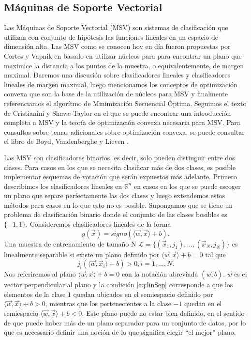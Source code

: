 \documentclass[letterpaper,12pt]{book}
\begin{document}
\subsection{Máquinas de Soporte Vectorial}

Las Máquinas de Soporte Vectorial (MSV) son sistemas de clasificación que utilizan con conjunto de hipótesis las funciones lineales en un espacio de dimensión alta. Las MSV como se conocen hoy en día fueron propuestas por Cortes y Vapnik en \cite{cortes_support-vector_1995} basado en utilizar núcleos para para encontrar un plano que maximice la distancia a los puntos de la muestra, o equivalentemente, de margen maximal. Daremos una discusión sobre clasificadores lineales y clasificadores lineales de margen maximal, luego mencionamos los conceptos de optimización convexa que son la base de la utilización de núcleos para MSV y finalmente referenciamos el algorítmo de Minimización Secuencial Óptima. Seguimos el texto de Cristianini y Shawe-Taylor \cite{cristianini_introduction_2000} en el que se puede encontrar una introducción completa a MSV y la teoría de optimización convexa necesaria para MSV. Para consultas sobre temas adicionales sobre optimización convexa, se puede consultar el libro de Boyd, Vandenberghe y Lieven \cite{boyd_convex_2004}.

Las MSV son clasificadores binarios, es decir, solo pueden distinguir entre dos clases. Para casos en los que se necesita clasificar más de dos clases, es posible implementar esquemas de votación que serán expuestos más adelante. Primero describimos los clasificadores lineales en $\mathbb{R}^n$ en casos en los que se puede escoger un plano que separe perfectamente las dos clases y luego extendemos estos métodos para casos en lo que esto no es posible. Supongamos que se tiene un problema de clasificación binario donde el conjunto de las clases bosibles es $\{-1,1\}$. Consideremos clasificadores lineales de la forma
\begin{equation}\label{eq:clasificadorLineal}
g(\vec{x}) = signo( \langle \vec{w}, \vec{x} \rangle + b).
\end{equation}
 Una muestra de entrenamiento de tamaño N  $\mathcal{L} = \{(\vec{x}_1, j_1), \dots, (\vec{x}_N, j_N)\}$ es linealmente separable si existe un plano definido por $\langle \vec{w}, \vec{x} \rangle +b =0$ tal que
\begin{equation}\label{eq:linSep}
j_{i}\left(\langle \vec{w}, \vec{x}_i \rangle +b\right)> 0, i = 1,\dots, N.
\end{equation}
Nos referiremos al plano $\langle \vec{w}, \vec{x} \rangle +b = 0$ con la notación abreviada $(\vec{w},b)$. $\vec{w}$ es el vector perpendicular al plano y la condición \ref{eq:linSep} corresponde a que los elementos de la clase $1$ quedan ubicados en el semiespacio definido por $\langle \vec{w}, \vec{x} \rangle +b > 0$, mientras que los pertenecientes a la clase $-1$ quedan en el semiespacio $\langle \vec{w}, \vec{x} \rangle + b< 0$. Este plano puede no estar bien definido, en el sentido de que puede haber más de un plano separador para un conjunto de datos, por lo que es necessario definir una noción de lo que significa elegir ``el mejor'' plano.
\end{document}
